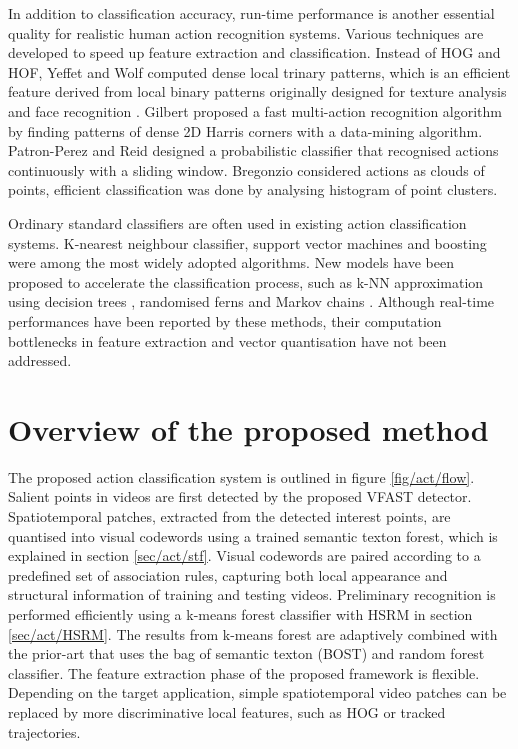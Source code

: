 In addition to classification accuracy, run-time performance is another essential quality for realistic human action recognition systems. Various techniques are developed to speed up feature extraction and classification. 
Instead of HOG and HOF, Yeffet and Wolf \cite{Yeffet2009} computed dense local trinary patterns, which is an efficient feature derived from local binary patterns originally designed for texture analysis and face recognition \cite{Ahonen2006}. 
Gilbert \etal \cite{Gilbert2009} proposed a fast multi-action recognition algorithm by finding patterns of dense 2D Harris corners with a data-mining algorithm.
Patron-Perez and Reid \cite{Patron2007} designed a probabilistic classifier that recognised actions continuously with a sliding window. 
Bregonzio \etal \cite{Bregonzio2009} considered actions as clouds of points, efficient classification was done by analysing histogram of point clusters. 

Ordinary standard classifiers are often used in existing action classification systems. 
K-nearest neighbour classifier, support vector machines and boosting were among the most widely adopted algorithms. New models have been proposed to accelerate the classification process, such as k-NN approximation using decision trees \cite{Lin2009}, randomised ferns \cite{Oshin2009} and Markov chains \cite{Messing2009}.   
Although real-time performances have been reported by these methods, their computation bottlenecks in feature extraction and vector quantisation have not been addressed. 

\section{Overview of the proposed method} 
\label{sec/act/overview}

The proposed action classification system is outlined in figure \ref{fig/act/flow}. 
Salient points in videos are first detected by the proposed VFAST detector. 
Spatiotemporal patches, extracted from the detected interest points, are quantised into visual codewords using a trained semantic texton forest, which is explained in section \ref{sec/act/stf}. 
Visual codewords are paired according to a predefined set of association rules, capturing both local appearance and structural information of training and testing videos.  
Preliminary recognition is performed efficiently using a k-means forest classifier with HSRM in section \ref{sec/act/HSRM}. 
The results from k-means forest are adaptively combined with the prior-art that uses the bag of semantic texton (BOST) and random forest classifier.
The feature extraction phase of the proposed framework is flexible. 
Depending on the target application, simple spatiotemporal video patches can be replaced by more discriminative local features, such as HOG or tracked trajectories.

